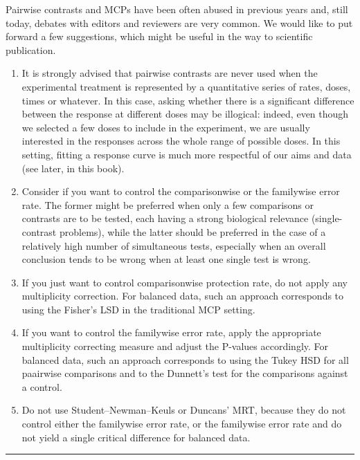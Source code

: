 \documentclass[a4paper,12pt,oneside]{book}
\providecommand{\tightlist}{%
  \setlength{\itemsep}{0pt}\setlength{\parskip}{0pt}}
\begin{document}
Pairwise contrasts and MCPs have been often abused in previous years and, still today, debates with editors and reviewers are very common. We would like to put forward a few suggestions, which might be useful in the way to scientific publication.

\begin{enumerate}
\def\labelenumi{\arabic{enumi}.}
\tightlist
\item
  It is strongly advised that pairwise contrasts are never used when the experimental treatment is represented by a quantitative series of rates, doses, times or whatever. In this case, asking whether there is a significant difference between the response at different doses may be illogical: indeed, even though we selected a few doses to include in the experiment, we are usually interested in the responses across the whole range of possible doses. In this setting, fitting a response curve is much more respectful of our aims and data (see later, in this book).
\item
  Consider if you want to control the comparisonwise or the familywise error rate. The former might be preferred when only a few comparisons or contrasts are to be tested, each having a strong biological relevance (single-contrast problems), while the latter should be preferred in the case of a relatively high number of simultaneous tests, especially when an overall conclusion tends to be wrong when at least one single test is wrong.
\item
  If you just want to control comparisonwise protection rate, do not apply any multiplicity correction. For balanced data, such an approach corresponds to using the Fisher's LSD in the traditional MCP setting.
\item
  If you want to control the familywise error rate, apply the appropriate multiplicity correcting measure and adjust the P-values accordingly. For balanced data, such an approach corresponds to using the Tukey HSD for all paairwise comparisons and to the Dunnett's test for the comparisons against a control.
\item
  Do not use Student--Newman--Keuls or Duncans' MRT, because they do not control either the familywise error rate, or the familywise error rate and do not yield a single critical difference for balanced data.
\end{enumerate}

\begin{center}\rule{0.5\linewidth}{0.5pt}\end{center}
\end{document}
